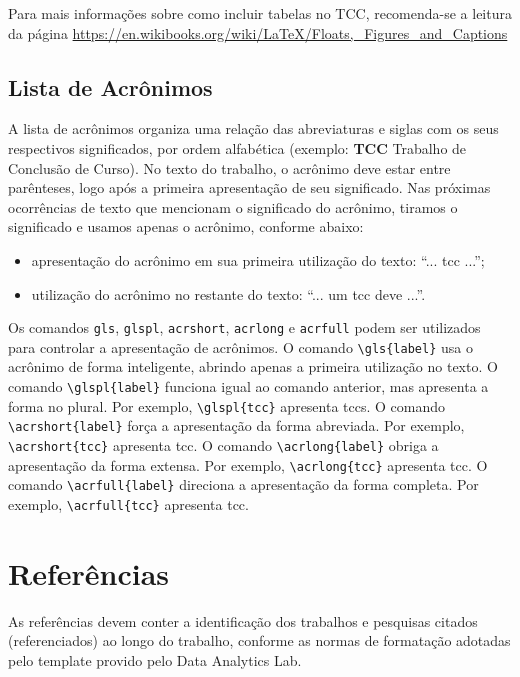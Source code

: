 \documentclass{eic-bcc-tcc}
\begin{document}
Para mais informações sobre como incluir tabelas no TCC, recomenda-se a leitura da página \url{https://en.wikibooks.org/wiki/LaTeX/Floats,_Figures_and_Captions}


\subsection{Lista de Acrônimos}

A lista de acrônimos organiza uma relação das abreviaturas e siglas com os seus respectivos significados, por ordem alfabética (exemplo: \textbf{TCC} Trabalho de Conclusão de Curso). No texto do trabalho, o acrônimo deve estar entre parênteses, logo após a primeira apresentação de seu significado. Nas próximas ocorrências de texto que mencionam o significado do acrônimo, tiramos o significado e usamos apenas o acrônimo, conforme abaixo:
\begin{itemize}
    \item apresentação do acrônimo em sua primeira utilização do texto: ``... \acrfull{tcc} ...'';
    \item utilização do acrônimo no restante do texto: ``... um \acrshort{tcc} deve ...''.
\end{itemize}

Os comandos \texttt{gls}, \texttt{glspl}, \texttt{acrshort}, \texttt{acrlong} e \texttt{acrfull} podem ser utilizados para controlar a apresentação de acrônimos. O comando \verb|\gls{label}| usa o acrônimo de forma inteligente, abrindo apenas a primeira utilização no texto. O comando \verb|\glspl{label}| funciona igual ao comando anterior, mas apresenta a forma no plural. Por exemplo, \verb|\glspl{tcc}| apresenta \glspl{tcc}. O comando \verb|\acrshort{label}| força a apresentação da forma abreviada. Por exemplo, \verb|\acrshort{tcc}| apresenta \acrshort{tcc}. O comando \verb|\acrlong{label}| obriga a apresentação da forma extensa. Por exemplo, \verb|\acrlong{tcc}| apresenta \acrlong{tcc}. O comando \verb|\acrfull{label}| direciona a apresentação da forma completa. Por exemplo, \verb|\acrfull{tcc}| apresenta \acrfull{tcc}.


\section{Referências}

As referências devem conter a identificação dos trabalhos e pesquisas citados (referenciados) ao longo do trabalho, conforme as normas de formatação adotadas pelo template provido pelo Data Analytics Lab.
\end{document}
